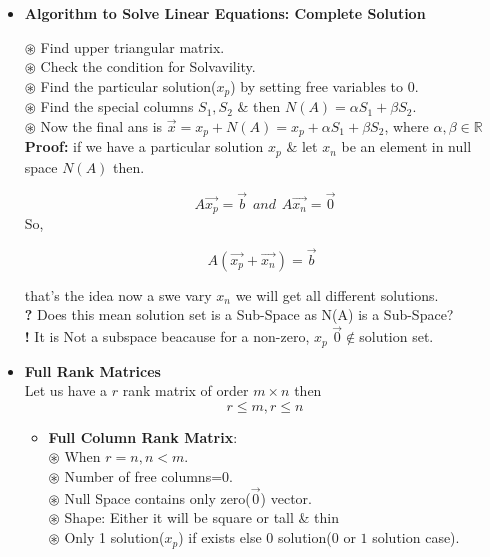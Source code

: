 \documentclass[a4paper,11pt]{article}
\numberwithin{equation}{section}
\begin{document}
\begin{itemize}
\item \textbf{Algorithm to Solve Linear Equations: Complete Solution}

\textbf{$\circledast$ }Find upper triangular matrix.\\
\textbf{$\circledast$ }Check the condition for Solvavility.\\
\textbf{$\circledast$ }Find the particular solution($x_p$) by setting free variables to $0$.\\
\textbf{$\circledast$ }Find the special columns $S_1,S_2$ \& then  $N(A)=\alpha S_1+\beta S_2$.\\
\textbf{$\circledast$ }Now the final ans is $\vec{x}=x_p+N(A)=x_p+\alpha S_1+\beta S_2$, where $\alpha ,\beta \in \mathbb{R} $\\

\textbf{Proof: }if we have a particular solution $x_p$ \& let $x_n$ be an element in null space $N(A)$ then.

\begin{equation}
    A\vec{x_p}=\vec{b} \hspace{5pt} and \hspace{5pt} A\vec{x_n}=\vec{0}
\end{equation}
So,

\begin{equation}
    A(\vec{x_p}+\vec{x_n})=\vec{b} \hspace{5pt}
\end{equation}

that's the idea now a swe vary $x_n$ we will get all different solutions.\\

\textbf{?} Does this mean solution set is a Sub-Space as N(A) is a Sub-Space?\\
\textbf{! }It is Not a subspace beacause for a non-zero, $x_p$ $\vec{0}\notin $solution set.\\

\item \textbf{Full Rank Matrices}\\
Let us have a $r$ rank matrix of order $m\times n$ then 
\begin{equation}
    r\leq m,r\leq n
\end{equation}

\begin{itemize}
    \item \textbf{Full Column Rank Matrix}:\\
        \textbf{$\circledast$ }When $r=n,n<m$.\\
        \textbf{$\circledast$ }Number of free columns=$0$.\\
        \textbf{$\circledast$ }Null Space contains only zero($\vec{0}$) vector.\\
        \textbf{$\circledast$ }Shape: Either it will be square or tall \& thin\\
        \textbf{$\circledast$ }Only 1 solution($x_p$) if exists else $0$ solution($0$ or $1$ solution case).\\


\end{itemize}
\end{itemize}
\end{document}
